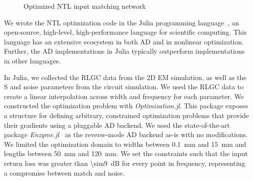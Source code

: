 \begin{figure}[t]
	\centering
	\caption{Optimized NTL input matching network}
	\label{fig:shape}
\end{figure}

We wrote the NTL optimization code in the Julia programming language~\cite{bezansonJuliaFreshApproach2017a}, an open-source, high-level, high-performance language for scientific computing.
This language has an extensive ecosystem in both AD and in nonlinear optimization.
Further, the AD implementations in Julia typically outperform implementations in other languages.

In Julia, we collected the RLGC data from the 2D EM simulation, as well as the S and noise parameters from the circuit simulation.
We used the RLGC data to create a linear interpolation across width and frequency for each parameter.
We constructed the optimization problem with \textit{Optimization.jl}.
This package exposes a structure for defining arbitrary, constrained optimization problems that provide their gradients using a pluggable AD backend.
We used the state-of-the-art package \textit{Enzyme.jl}~\cite{mosesInsteadRewritingForeign2020} as the reverse-mode AD backend as-is with no modifications.
We limited the optimization domain to widths between \qty{0.1}{\mm} and \qty{15}{\mm} and lengths between \qty{50}{\mm} and \qty{120}{\mm}.
We set the constraints such that the input return loss was greater than \qty{\sim9}{\dB} for every point in frequency, representing a compromise between match and noise.

